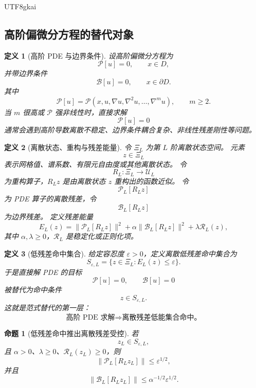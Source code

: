 \documentclass[12pt]{article}
\newtheorem{definition}{定义}[section]
\newtheorem{proposition}{命题}[section]
\begin{document}
\begin{CJK*}{UTF8}{gkai}
\subsection{高阶偏微分方程的替代对象}
\label{subsec:tex55-pde-replacement-object}

\begin{definition}[高阶 PDE 与边界条件]
\label{def:tex55-pde-high-order}
设高阶偏微分方程为
\[
  \mathcal P[u]=0,
  \qquad
  x\in D,
\]
并带边界条件
\[
  \mathcal B[u]=0,
  \qquad
  x\in\partial D.
\]
其中
\[
  \mathcal P[u]
  =
  \mathcal P(x,u,\nabla u,\nabla^2u,\ldots,\nabla^m u),
  \qquad
  m\ge2.
\]
当 \(m\) 很高或 \(\mathcal P\) 强非线性时，直接求解
\[
  \mathcal P[u]=0
\]
通常会遇到高阶导数离散不稳定、边界条件耦合复杂、非线性残差刚性等问题。
\end{definition}

\begin{definition}[离散状态、重构与残差能量]
\label{def:tex55-pde-residual-energy}
令 \(\Xi_L\) 为第 \(L\) 阶离散状态空间。
元素
\[
  z\in\Xi_L
\]
表示网格值、谱系数、有限元自由度或其他离散状态。
令
\[
  R_L:\Xi_L\to\mathcal U_L
\]
为重构算子，\(R_Lz\) 是由离散状态 \(z\) 重构出的函数近似。
令
\[
  \mathcal P_L[R_Lz]
\]
为 PDE 算子的离散残差，令
\[
  \mathcal B_L[R_Lz]
\]
为边界残差。
定义残差能量
\[
  E_L(z)
  =
  \lVert\mathcal P_L[R_Lz]\rVert^2
  +
  \alpha
  \lVert\mathcal B_L[R_Lz]\rVert^2
  +
  \lambda
  \mathcal R_L(z),
\]
其中 \(\alpha,\lambda\ge0\)，\(\mathcal R_L\) 是稳定化或正则化项。
\end{definition}

\begin{definition}[低残差命中集合]
\label{def:tex55-pde-low-residual-hit-set}
给定容忍度 \(\varepsilon>0\)，定义离散低残差命中集合为
\[
  S_{\varepsilon,L}
  =
  \{z\in\Xi_L:E_L(z)\le\varepsilon\}.
\]
于是直接解 PDE 的目标
\[
  \mathcal P[u]=0,
  \qquad
  \mathcal B[u]=0
\]
被替代为命中条件
\[
  z\in S_{\varepsilon,L}.
\]
这就是范式替代的第一层：
\[
  \boxed{
  \text{高阶 PDE 求解}
  \Longrightarrow
  \text{离散残差低能集合命中。}
  }
\]
\end{definition}

\begin{proposition}[低残差命中推出离散残差受控]
\label{prop:tex55-pde-low-residual-controlled}
若
\[
  z_L\in S_{\varepsilon,L},
\]
且 \(\alpha>0\)、\(\lambda\ge0\)、\(\mathcal R_L(z_L)\ge0\)，则
\[
  \lVert\mathcal P_L[R_Lz_L]\rVert
  \le
  \varepsilon^{1/2},
\]
并且
\[
  \lVert\mathcal B_L[R_Lz_L]\rVert
  \le
  \alpha^{-1/2}\varepsilon^{1/2}.
\]
\end{proposition}


\end{CJK*}
\end{document}
